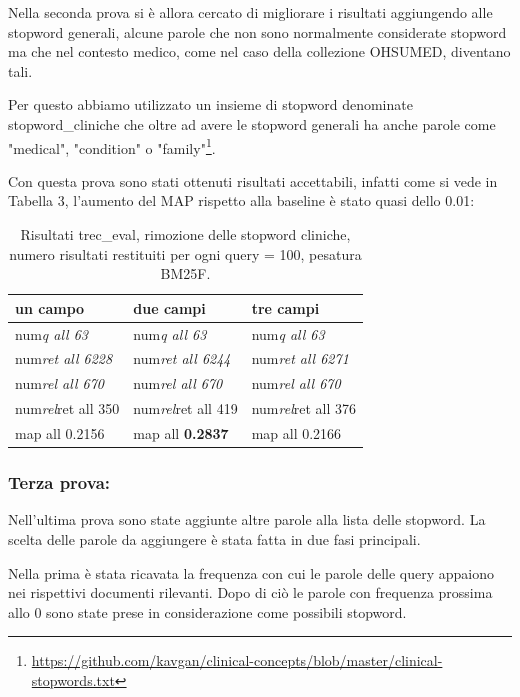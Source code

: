 \documentclass[runningheads]{llncs}
\begin{document}
Nella seconda prova si \`e allora cercato di migliorare i risultati aggiungendo alle stopword generali, alcune parole che non sono normalmente considerate stopword ma che nel contesto medico, come nel caso della collezione OHSUMED, diventano tali.

Per questo abbiamo utilizzato un insieme di stopword denominate stopword\_cliniche che oltre ad avere le stopword generali ha anche parole come "medical", "condition" o "family"\footnote{ \url{https://github.com/kavgan/clinical-concepts/blob/master/clinical-stopwords.txt}}.

Con questa prova sono stati ottenuti risultati accettabili, infatti come si vede in Tabella 3, l'aumento del MAP rispetto alla baseline \`e stato quasi dello 0.01:
\begin{table}
\centering
\begin{tabular}{lll}
\hline
\textbf{ un campo }           & \textbf{ due campi }           & \textbf{ tre campi }            \\ \hline
 num\textit{q all 63 }       &  num\textit{q all 63 }       &  num\textit{q all 63 }        \\
 num\textit{ret all 6228 }  &  num\textit{ret all 6244 }  &  num\textit{ret all 6271 }   \\
 num\textit{rel all 670 }    &  num\textit{rel all 670 }    &  num\textit{rel all 670 }     \\
 num\textit{rel}ret all 350  &  num\textit{rel}ret all 419  &  num\textit{rel}ret all 376   \\
map all 0.2156               & map all \bf 0.2837               & map all 0.2166          \\ \hline
\end{tabular}

\caption{ Risultati trec\_eval, rimozione delle stopword cliniche, numero risultati restituiti per ogni query = 100, pesatura BM25F.}
\end{table}


\subsubsection{Terza prova:}

Nell'ultima prova sono state aggiunte altre parole alla lista delle stopword. La scelta delle parole da aggiungere \`e stata fatta in due fasi principali.

Nella prima \`e stata ricavata la frequenza con cui le parole delle query appaiono nei rispettivi documenti rilevanti. Dopo di ci\`o le parole con frequenza prossima allo 0 sono state prese in considerazione come possibili stopword.
\end{document}
